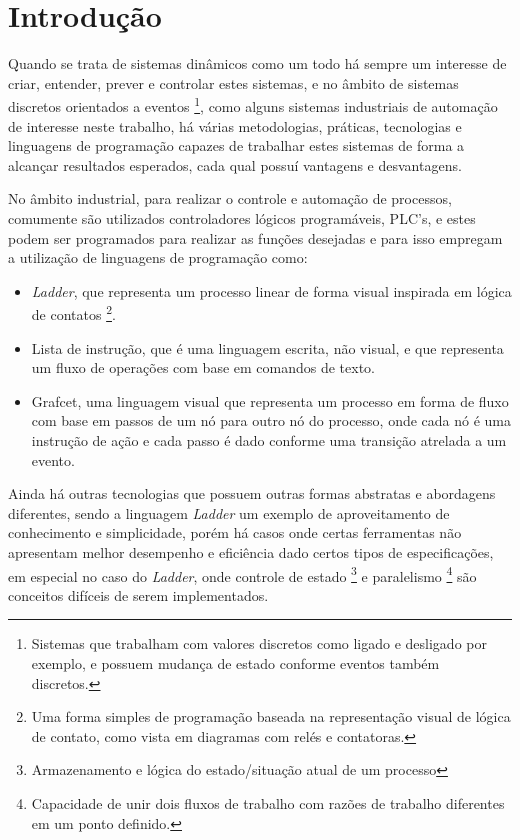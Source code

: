\chapter{Introdução}

Quando se trata de sistemas dinâmicos como um todo há sempre um interesse de criar, entender, prever e controlar estes sistemas, e no âmbito de sistemas discretos orientados a eventos \footnote{Sistemas que trabalham com valores discretos como ligado e desligado por exemplo, e possuem mudança de estado conforme eventos também discretos.}, como alguns sistemas industriais de automação de interesse neste trabalho, há várias metodologias, práticas, tecnologias e linguagens de programação capazes de trabalhar estes sistemas de forma a alcançar resultados esperados, cada qual possuí vantagens e desvantagens.

No âmbito industrial, para realizar o controle e automação de processos, comumente são utilizados controladores lógicos programáveis, PLC's, e estes podem ser programados para realizar as funções desejadas e para isso empregam a utilização de linguagens de programação como: 

\begin{itemize}
	\item \textit{Ladder}, que representa um processo linear de forma visual inspirada em lógica de contatos \footnote{Uma forma simples de programação baseada na representação visual de lógica de contato, como vista em diagramas com relés e contatoras.}.
	\item Lista de instrução, que é uma linguagem escrita, não visual, e que representa um fluxo de operações com base em comandos de texto.
	\item Grafcet, uma linguagem visual que representa um processo em forma de fluxo com base em passos de um nó para outro nó do processo, onde cada nó é uma instrução de ação e cada passo é dado conforme uma transição atrelada a um evento. 
\end{itemize}

Ainda há outras tecnologias que possuem outras formas abstratas e abordagens diferentes, sendo a linguagem \textit{Ladder} um exemplo de aproveitamento de conhecimento e simplicidade, porém há casos onde certas ferramentas não apresentam melhor desempenho e eficiência dado certos tipos de especificações, em especial no caso do \textit{Ladder}, onde controle de estado \footnote{Armazenamento e lógica do estado/situação atual de um processo} e paralelismo \footnote{Capacidade de unir dois fluxos de trabalho com razões de trabalho diferentes em um ponto definido.} são conceitos difíceis de serem implementados. 

